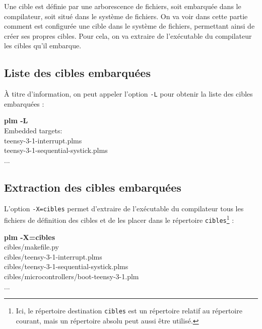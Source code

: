 











Une cible est définie par une arborescence de fichiers, soit embarquée dans le compilateur, soit situé dans le système de fichiers. On va voir dans cette partie comment est configurée une cible dans le système de fichiers, permettant ainsi de créer ses propres cibles. Pour cela, on va extraire de l'exécutable du compilateur les cibles qu'il embarque.

\subsection{Liste des cibles embarquées}
À titre d'information, on peut appeler l'option \texttt{-L} pour obtenir la liste des cibles embarquées :
\begin{SHELL}
{\bfseries plm -L}\\
Embedded targets:\\ 
\hspace*{1.2em}teensy-3-1-interrupt.plms\\
\hspace*{1.2em}teensy-3-1-sequential-systick.plms\\
\hspace*{1.2em}...
\end{SHELL}

\subsection{Extraction des cibles embarquées}
L'option \texttt{-X=cibles} permet d'extraire de l'exécutable du compilateur tous les fichiers de définition des cibles et de les placer dans le répertoire \texttt{cibles}\footnote{Ici, le répertoire destination \texttt{cibles} est un répertoire relatif au répertoire courant, mais un répertoire absolu peut aussi être utilisé.} :
\begin{SHELL}
{\bfseries plm -X=cibles}\\
\hspace*{1.2em}cibles/makef{}ile.py\\
\hspace*{1.2em}cibles/teensy-3-1-interrupt.plms\\
\hspace*{1.2em}cibles/teensy-3-1-sequential-systick.plms\\
\hspace*{1.2em}cibles/microcontrollers/boot-teensy-3-1.plm\\
\hspace*{1.2em}...
\end{SHELL}

